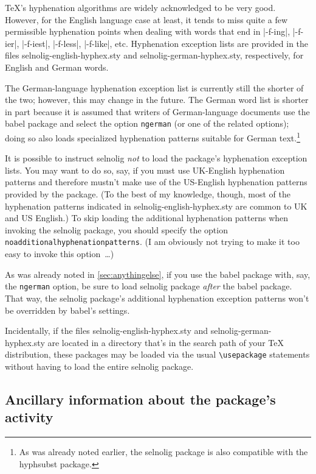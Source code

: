 \documentclass[11pt]{article}
\newcommand{\pkg}[1]{\textsf{#1}}
\newcommand{\opt}[1]{\texttt{#1}}
\newcommand{\cmmd}[1]{\texttt{\textbackslash #1}}
\begin{document}
\TeX's hyphenation algorithms are widely acknowledged to be very good. However, for the English language case at least, it tends to miss quite a few permissible hyphenation points when dealing with words that end in |-f-ing|, |-f-ier|, |-f-iest|, |-f-less|, |-f-like|, etc. Hyphenation exception lists are provided in the files \pkg{selnolig-english-hyphex.sty} and \pkg{selnolig-german-hyphex.sty}, respectively, for English and German words.

The German-language hyphenation exception list is currently still the shorter of the two; however, this may change in the future. The German word list is shorter in part because it is assumed that writers of German-language documents use the \pkg{babel} package and select the option \opt{ngerman} (or one of the related options); doing so also loads specialized hyphenation patterns suitable for German text.\footnote{As was already noted earlier, the \pkg{selnolig} package is also compatible with the \pkg{hyphsubst} package.} 

It is possible to instruct \pkg{selnolig} \emph{not} to load the package's hyphenation exception lists. You may want to do so, say, if you must use UK-English hyphenation patterns and therefore mustn't make use of the US-English hyphenation patterns provided by the package. (To the best of my knowledge, though, most of the hyphenation patterns indicated in \pkg{selnolig-english-hyphex.sty} are common to UK and US English.) To skip loading the additional hyphenation patterns when invoking the \pkg{selnolig} package, you should specify the option \opt{noadditional\-hyphen\-a\-tion\-patterns}. (I am obviously not trying to make it too easy to invoke this option~\dots)

As was already noted in \cref{sec:anythingelse}, if you use the \pkg{babel} package with, say, the \opt{ngerman} option, be sure to load \pkg{selnolig} package \emph{after} the \pkg{babel} package. That way, the \pkg{selnolig} package's additional hyphenation exception patterns won't be overridden by \pkg{babel}'s settings.

Incidentally, if the files \pkg{selnolig-english-hyphex.sty} and \pkg{selnolig-german-hyphex.sty} are located in a directory that's in the search path of your TeX distribution, these packages may be loaded via the usual \cmmd{usepackage} statements without having to load the entire \pkg{selnolig} package.



\subsection{Ancillary information about the package's activity} \label{sec:debugon}
\end{document}
